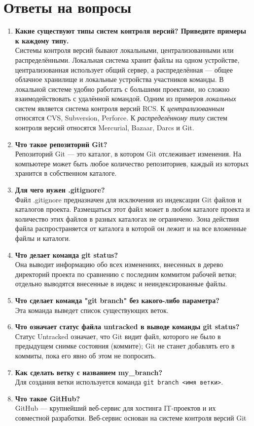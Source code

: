 \chapter*{Ответы на вопросы}

\begin{enumerate}
	\item \textbf{Какие существуют типы систем контроля версий?
		Приведите примеры к каждому типу.}\\
		Системы контроля версий бывают локальными, централизованными или
		распределёнными. Локальная система хранит файлы на одном устройстве,
		централизованная использует общий сервер, а распределённая --- общее
		облачное хранилище и локальные устройства участников команды.
		В локальной системе удобно работать с большими проектами,
		но сложно взаимодействовать с удалённой командой.
		Одним из примеров \textit{локальных} систем является система
		контроля версий RCS.
		К \textit{централизованным} относятся CVS, Subversion, Perforce.
		К \textit{распределённому типу} систем контроля версий относятся
		Mercurial, Bazaar, Darcs и Git.
	\item \textbf{Что такое репозиторий Git?}\\
		Репозиторий Git --- это каталог, в котором Git отслеживает изменения.
		На компьютере может быть любое количество репозиториев,
		каждый из которых хранится в собственном каталоге.
	\item \textbf{Для чего нужен .gitignore?}\\
		Файл .gitignore предназначен для исключения из индексации Git файлов
		и каталогов проекта. Размещаться этот файл может в любом каталоге
		проекта и количество этих файлов в разных каталогах не ограничено.
		Зона действия файла распространяется от каталога в которой он лежит
		и на все вложенные файлы и каталоги.
	\item \textbf{Что делает команда git status?}\\
		Она выводит информацию обо всех изменениях, внесенных в дерево
		директорий проекта по сравнению с последним коммитом рабочей ветки;
		отдельно выводятся внесенные в индекс и неиндексированные файлы.
	\item \textbf{Что сделает команда "git branch" без какого-либо параметра?}\\
		Эта команда выведет список существующих веток.
	\item \textbf{Что означает статус файла untracked в выводе команды
		git status?}\\
		Статус Untracked означает, что Git видит файл, которого не было
		в предыдущем снимке состояния (коммите); Git не станет добавлять
		его в коммиты, пока его явно об этом не попросить.
	\item \textbf{Как сделать ветку с названием my\_branch?}\\
		Для создания ветки используется команда \texttt{git branch <имя ветки>}.
	\item \textbf{Что такое GitHub?}\\
		GitHub — крупнейший веб-сервис для хостинга IT-проектов
		и их совместной разработки. Веб-сервис основан на системе
		контроля версий Git
\end{enumerate}

